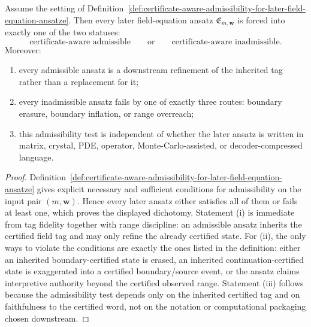 \begin{proposition}
\label{prop:certificate-aware-field-interface-induces-sharp-admissibility-dichotomy}
Assume the setting of Definition~\ref{def:certificate-aware-admissibility-for-later-field-equation-ansatze}. Then every later field-equation ansatz \(\mathfrak E_{m,\mathbf w}\) is forced into exactly one of the two statuses:
\[
  \text{certificate-aware admissible}
  \qquad\text{or}\qquad
  \text{certificate-aware inadmissible}.
\]
Moreover:
\begin{enumerate}[label=(\roman*)]
  \item every admissible ansatz is a downstream refinement of the inherited tag rather than a replacement for it;
  \item every inadmissible ansatz fails by one of exactly three routes: boundary erasure, boundary inflation, or range overreach;
  \item this admissibility test is independent of whether the later ansatz is written in matrix, crystal, PDE, operator, Monte-Carlo-assisted, or decoder-compressed language.
\end{enumerate}
\end{proposition}

\begin{proof}
Definition~\ref{def:certificate-aware-admissibility-for-later-field-equation-ansatze} gives explicit necessary and sufficient conditions for admissibility on the input pair \((m,\mathbf w)\). Hence every later ansatz either satisfies all of them or fails at least one, which proves the displayed dichotomy. Statement (i) is immediate from tag fidelity together with range discipline: an admissible ansatz inherits the certified field tag and may only refine the already certified state. For (ii), the only ways to violate the conditions are exactly the ones listed in the definition: either an inherited boundary-certified state is erased, an inherited continuation-certified state is exaggerated into a certified boundary/source event, or the ansatz claims interpretive authority beyond the certified observed range. Statement (iii) follows because the admissibility test depends only on the inherited certified tag and on faithfulness to the certified word, not on the notation or computational packaging chosen downstream.
\end{proof}

